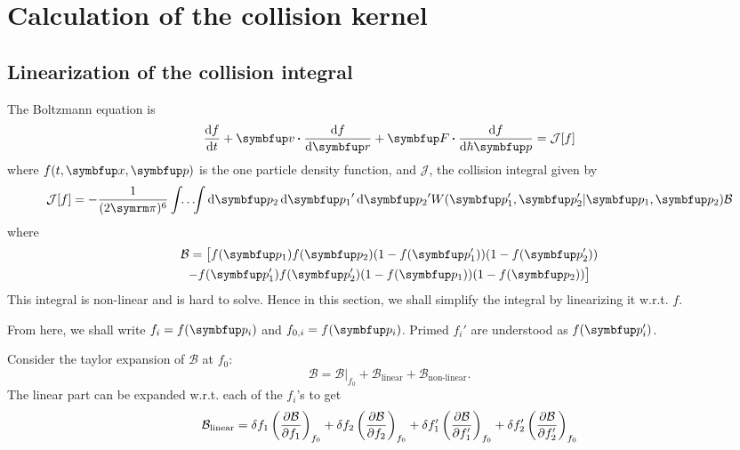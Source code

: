 \chapter{Calculation of the collision kernel}

\section{Linearization of the collision integral}

The Boltzmann equation is
\begin{equation}
  \odv{f}{t} + \vv{v} \vdot \odv{f}{\vv{r}} + \vv{F} \vdot \odv{f}{\hbar\vv{p}} = \mathcal{J}[f]
\end{equation}
where \(f(t, \vv{x}, \vv{p})\) is the one particle density function, and \(\mathcal{J}\), the collision integral given by
\begin{equation}
  \mathcal{J}[f]
  = - \frac{1}{(2\cpi)^6} \idotsint \odif{\vv{p}_2,\vv{p_1}',\vv{p_2}'} W(\vv{p}_1', \vv{p}_2' | \vv{p}_1, \vv{p}_2) \mathcal{B}
\end{equation}
where
\begin{multline}
  \mathcal{B} = \big[ f(\vv{p}_1)f(\vv{p}_2)(1 - f(\vv{p}_1'))(1 - f(\vv{p}_2')) \\
    - f(\vv{p}_1')f(\vv{p}_2')(1 - f(\vv{p}_1))(1 - f(\vv{p}_2)) \big]
\end{multline}
This integral is non-linear and is hard to solve. Hence in this section, we shall simplify the integral by linearizing it w.r.t. \(f\).

From here, we shall write \(f_i = f(\vv{p}_i)\) and \(f_{0,i} = f(\vv{p}_i)\). Primed \(f_i'\) are understood as \(f(\vv{p}_i')\).

Consider the taylor expansion of \(\mathcal{B}\) at \(f_0\):
\begin{equation}
  \mathcal{B} = \mathcal{B}|_{f_0} + \mathcal{B}_{\textrm{linear}} + \mathcal{B}_{\textrm{non-linear}}.
\end{equation}
The linear part can be expanded w.r.t. each of the \(f_i\)'s to get
\begin{equation}
  \mathcal{B}_{\textrm{linear}}
  = \fdif{f_1}\pdv{\mathcal{B}}{f_1}_{f_0} + \fdif{f_2}\pdv{\mathcal{B}}{f_2}_{f_0}
  + \fdif{f_1'}\pdv{\mathcal{B}}{f_1'}_{f_0} + \fdif{f_2'} \pdv{\mathcal{B}}{f_2'}_{f_0}
\end{equation}

